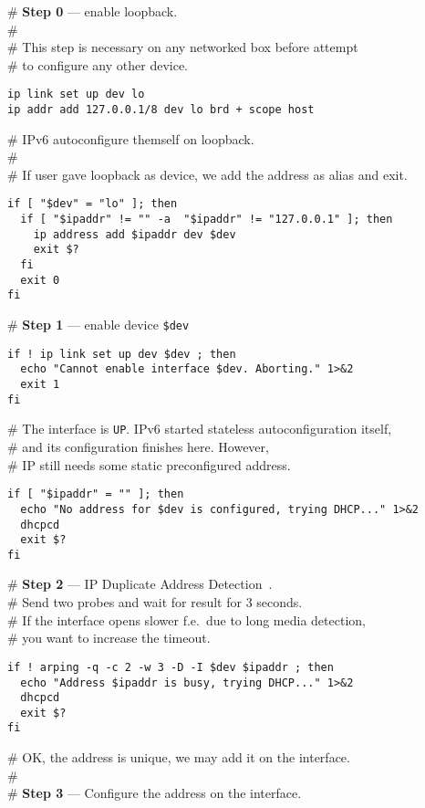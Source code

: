 \begin{flushleft}
\# {\bf Step 0} --- enable loopback.\\
\#\\
\# This step is necessary on any networked box before attempt\\
\# to configure any other device.\\
\end{flushleft}
\begin{verbatim}
ip link set up dev lo
ip addr add 127.0.0.1/8 dev lo brd + scope host
\end{verbatim}
\begin{flushleft}
\# IPv6 autoconfigure themself on loopback.\\
\#\\
\# If user gave loopback as device, we add the address as alias and exit.
\end{flushleft}
\begin{verbatim}
if [ "$dev" = "lo" ]; then
  if [ "$ipaddr" != "" -a  "$ipaddr" != "127.0.0.1" ]; then
    ip address add $ipaddr dev $dev
    exit $?
  fi
  exit 0
fi
\end{verbatim}

\noindent\# {\bf Step 1} --- enable device \verb|$dev|

\begin{verbatim}
if ! ip link set up dev $dev ; then
  echo "Cannot enable interface $dev. Aborting." 1>&2
  exit 1
fi
\end{verbatim}
\begin{flushleft}
\# The interface is \verb|UP|. IPv6 started stateless autoconfiguration itself,\\
\# and its configuration finishes here. However,\\
\# IP still needs some static preconfigured address.
\end{flushleft}
\begin{verbatim}
if [ "$ipaddr" = "" ]; then
  echo "No address for $dev is configured, trying DHCP..." 1>&2
  dhcpcd
  exit $?
fi
\end{verbatim}

\begin{flushleft}
\# {\bf Step 2} --- IP Duplicate Address Detection~\cite{RFC-DHCP}.\\
\# Send two probes and wait for result for 3 seconds.\\
\# If the interface opens slower f.e.\ due to long media detection,\\
\# you want to increase the timeout.\\
\end{flushleft}
\begin{verbatim}
if ! arping -q -c 2 -w 3 -D -I $dev $ipaddr ; then
  echo "Address $ipaddr is busy, trying DHCP..." 1>&2
  dhcpcd
  exit $?
fi
\end{verbatim}
\begin{flushleft}
\# OK, the address is unique, we may add it on the interface.\\
\#\\
\# {\bf Step 3} --- Configure the address on the interface.
\end{flushleft}

